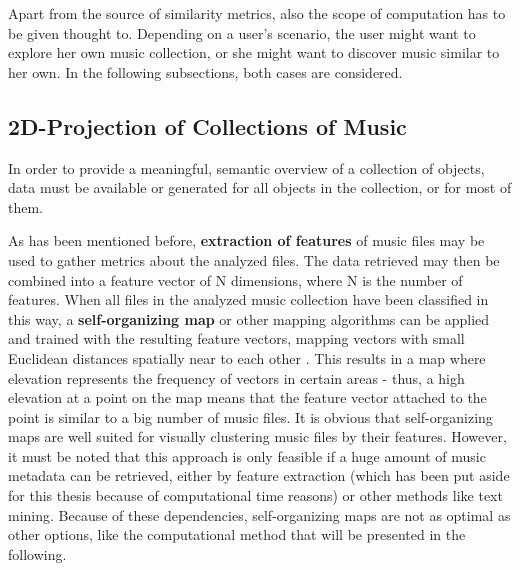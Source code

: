 Apart from the source of similarity metrics, also the scope of computation has to be given thought to.
Depending on a user's scenario, the user might want to explore her own music collection, or she might want
to discover music similar to her own. In the following subsections, both cases are considered.

\subsection{2D-Projection of Collections of Music}

In order to provide a meaningful, semantic overview of a collection of objects, data must be available 
or generated for all objects in the collection, or for most of them. 

As has been mentioned before, \textbf{extraction of features} of music files may be used to gather metrics
about the analyzed files. The data retrieved may then be combined into a feature vector of N dimensions,
where N is the number of features. When all files in the analyzed music collection have been classified in
this way, a \textbf{self-organizing map} or other mapping algorithms can be applied and trained with the resulting feature vectors, mapping 
vectors with small Euclidean distances spatially near to each other \cite{RAU_02ismir}. This results
in a map where elevation represents the frequency of vectors in certain areas - thus, a high elevation
at a point on the map means that the feature vector attached to the point is similar to a big number of music
files. It is obvious that self-organizing maps are well suited for visually clustering music files by their 
features. However, it must be noted that this approach is only feasible if a huge amount of music metadata 
can be retrieved, either by feature extraction (which has been put aside for this thesis because of computational time reasons) or other methods like text mining. Because of these dependencies, self-organizing 
maps are not as optimal as other options, like the computational method that will be presented in the following.

